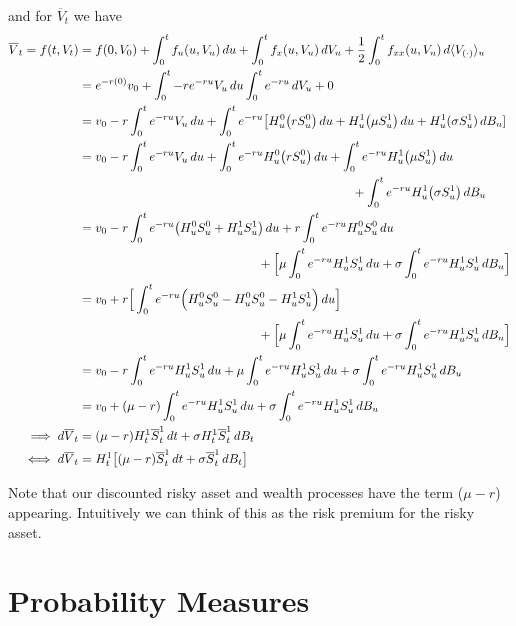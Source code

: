 \documentclass[12pt]{article}
\newlength\tindent
\renewcommand{\indent}{\hspace*{\tindent}}
\begin{document}
and for $\overline{V}_t$ we have
\begin{align*}
	\overline{V}_t = f(t,V_t) &= f(0,V_0) + \int^t_0 f_u(u,V_u)\,du + \int^t_0 f_x(u,V_u)\,dV_u + \frac{1}{2}\int^t_0 f_{xx}(u,V_u)\,d\langle V_{(\cdot)}\rangle_u \\
	&= e^{-r(0)}v_0 + \int^t_0 -re^{-ru}V_u\,du \int^t_0 e^{-ru}\,dV_u + 0 \\
	&= v_0 - r\int^t_0 e^{-ru}V_u\,du + \int^t_0 e^{-ru}\big[H^0_u\big(rS^0_u\big)\,du + H^1_u\big(\mu S^1_u\big)\,du + H^1_u(\sigma S^1_u)\,dB_u] \\
	&= v_0 - r\int^t_0 e^{-ru}V_u\,du + \int^t_0 e^{-ru}H^0_u\big(rS^0_u\big)\,du + \int^t_0 e^{-ru}H^1_u\big(\mu S^1_u\big)\,du \\
	&\hphantom{{}={v_0 - \int^t_0 e^{-ru}V_u\,du + \int^t_0 e^{-ru}H^0_u\big(rS^0_u\big)\,du + \int^t_0}} + \int^t_0 e^{-ru}H^1_u\big(\sigma S^1_u\big)\,dB_u \\
	&= v_0 - r\int^t_0 e^{-ru}\big(H^0_uS^0_u + H^1_uS^1_u\big)\,du + r\int^t_0 e^{-ru}H^0_uS^0_u\,du \\
	&\hphantom{{}={v_0 - r\int^t_0 e^{-ru}\big(H^0_uS^0_u + H^1_uS^1_u}} + \Big[\mu\int^t_0 e^{-ru}H^1_u S^1_u\,du + \sigma\int^t_0 e^{-ru}H^1_u S^1_u\,dB_u \Big] \\
	&= v_0 + r \Big[\int^t_0 e^{-ru}\Big(H^0_uS^0_u - H^0_uS^0_u - H^1_uS^1_u\Big)\,du\Big] \\
	&\hphantom{{}={v_0 - r\int^t_0 e^{-ru}\big(H^0_uS^0_u + H^1_uS^1_u}} + \Big[\mu\int^t_0 e^{-ru}H^1_u S^1_u\,du + \sigma\int^t_0 e^{-ru}H^1_u S^1_u\,dB_u \Big] \\
	&= v_0 - r\int^t_0 e^{-ru}H^1_uS^1_u\,du + \mu\int^t_0 e^{-ru}H^1_u S^1_u\,du + \sigma\int^t_0 e^{-ru}H^1_u S^1_u\,dB_u \\
	&= v_0 + (\mu - r) \int^t_0 e^{-ru}H^1_uS^1_u\,du + \sigma\int^t_0 e^{-ru}H^1_u S^1_u\,dB_u \\
	\implies d\overline{V}_t &= (\mu - r)H^1_t\overline{S}^1_t\,dt + \sigma H^1_t\overline{S}^1_t\,dB_t \\
	\iff d\overline{V}_t &= H^1_t\big[(\mu - r)\overline{S}^1_t\,dt + \sigma\overline{S}^1_t\,dB_t\big]
\end{align*}

\indent Note that our discounted risky asset and wealth processes have the term ($\mu - r$) appearing. Intuitively we can think of this as the risk premium for the risky asset. \\

\section{Probability Measures}
\end{document}
